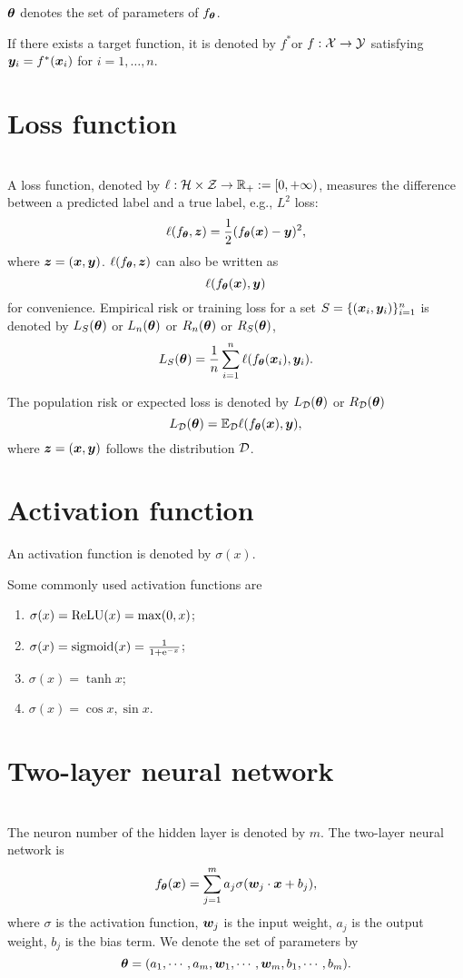 \documentclass{article}
\begin{document}
$\bm{\theta}$  denotes the set of parameters of  $f_{\bm{\theta}}$.  

If there exists a target function, it is denoted by $f^*$or $f:\mathcal{X}\to\mathcal{Y}$ satisfying $\bm{y}_i=f^*(\bm{x}_i)$ for $i=1,\ldots,n$.

\section{Loss function}~\\
A loss function, denoted by $\ell:\mathcal{H}\times\mathcal{Z}\to\mathbb{R}_+:=[0,+\infty)$, measures the difference between a predicted label and a true label, e.g., $L^2$ loss: 
\[
\ell(f_{\bm{\theta}},\bm{z})=\frac{1}{2}(f_{\bm{\theta}}(\bm{x})-\bm{y})^2,
\]
 where $\bm{z}=(\bm{x},\bm{y})$. $\ell(f_{\bm{\theta}},\bm{z})$ can also be written as 
\[
\ell(f_{\bm{\theta}}(\bm{x}),\bm{y})
\]
 for convenience.
Empirical risk or training loss for a set $S=\{(\bm{x}_i,\bm{y}_i)\}_{i=1}^{n}$ is denoted by   $L_S(\bm{\theta})$ or $L_{n}(\bm{\theta})$ or $R_{n}(\bm{\theta})$ or $R_{S}(\bm{\theta})$,
\begin{equation}
    L_S(\bm{\theta}) =\frac{1}{n}\sum_{i=1}^n\ell(f_{\bm{\theta}}(\bm{x}_i),\bm{y}_i).
\end{equation}


The population risk or expected loss is denoted by $L_{\mathcal{D}}(\bm{\theta})$ or $R_{\mathcal{D}}(\bm{\theta})$
\begin{equation}
    L_{\mathcal{D}}(\bm{\theta}) =\mathbb{E}_{\mathcal{D}}\ell(f_{\bm{\theta}}(\bm{x}),\bm{y}),
\end{equation}
where $\bm{z}=(\bm{x},\bm{y})$ follows the distribution $\mathcal{D}$.

\section{Activation function}
An activation function is denoted by $\sigma(x)$. 
\begin{exam}Some commonly used activation functions are~\\
    \begin{enumerate}
        \item $\sigma(x) = \mathrm{ReLU} (x) = \max (0, x)$;
        \item $\sigma(x) ={\rm sigmoid}(x)= \frac{1}{1 + \mathrm{e}^{-x}}$;
        \item $\sigma(x) = \tanh x$;
        \item $\sigma(x) = \cos x, \sin x$.
    \end{enumerate}
\end{exam}


\section{Two-layer neural network}~\\
The neuron number of the hidden layer is denoted by $m$. The two-layer neural network is 
\begin{equation}
    f_{\bm{\theta}}(\bm{x})=\sum_{j=1}^{m} a_j \sigma (\bm{w}_j\cdot \bm{x} + b_j),
\end{equation}
where $\sigma$ is the activation function, $\bm{w}_j$ is the input weight, $a_j$ is the output weight, $b_j$ is the bias term. We denote the set of parameters by 
\[
\bm{\theta}=(a_1,\cdots,a_m,\bm{w}_1,\cdots,\bm{w}_m,b_1,\cdots,b_m).
\] 
\end{document}
